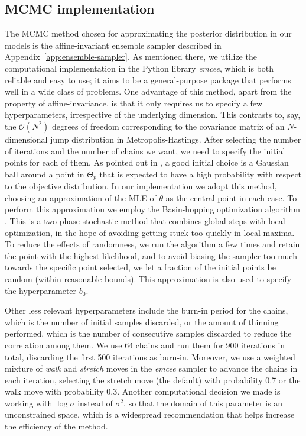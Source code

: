 \subsection{MCMC implementation}\label{app:mcmc}

The MCMC method chosen for approximating the posterior distribution in our models is the affine-invariant ensemble sampler described in Appendix~\ref{app:ensemble-sampler}. As mentioned there, we utilize the computational implementation in the Python library \textit{emcee}, which is both reliable and easy to use; it aims to be a general-purpose package that performs well in a wide class of problems. One advantage of this method, apart from the property of affine-invariance, is that it only requires us to specify a few hyperparameters, irrespective of the underlying dimension. This contrasts to, say, the \(\mathcal O(N^2)\) degrees of freedom corresponding to the covariance matrix of an \(N\)-dimensional jump distribution in Metropolis-Hastings. After selecting the number of iterations and the number of chains we want, we need to specify the initial points for each of them. As pointed out in \citet{foreman2013emcee}, a good initial choice is a Gaussian ball around a point in \(\Theta_p\) that is expected to have a high probability with respect to the objective distribution. In our implementation we adopt this method, choosing an approximation of the MLE of \(\theta\) as the central point in each case. To perform this approximation we employ the Basin-hopping optimization algorithm \citep{wales1997global}. This is a two-phase stochastic method that combines global steps with local optimization, in the hope of avoiding getting stuck too quickly in local maxima. To reduce the effects of randomness, we run the algorithm a few times and retain the point with the highest likelihood, and to avoid biasing the sampler too much towards the specific point selected, we let a fraction of the initial points be random (within reasonable bounds). This approximation is also used to specify the hyperparameter \(b_0\).

Other less relevant hyperparameters include the burn-in period for the chains, which is the number of initial samples discarded, or the amount of thinning performed, which is the number of consecutive samples discarded to reduce the correlation among them. We use 64 chains and run them for 900 iterations in total, discarding the first 500 iterations as burn-in. Moreover, we use a weighted mixture of \textit{walk} and \textit{stretch} moves in the \textit{emcee} sampler to advance the chains in each iteration, selecting the stretch move (the default) with probability 0.7 or the walk move with probability 0.3. Another computational decision we made is working with \(\log \sigma\) instead of \(\sigma^2\), so that the domain of this parameter is an unconstrained space, which is a widespread recommendation that helps increase the efficiency of the method.

